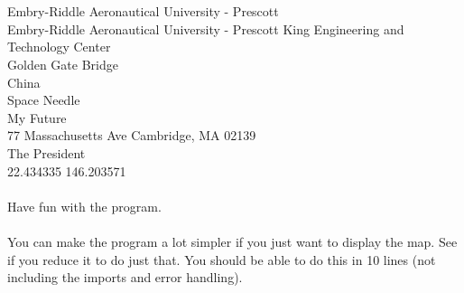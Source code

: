 \documentclass[11pt]{article}   %
\begin{document}
\\\\
Embry-Riddle Aeronautical University - Prescott\\
Embry-Riddle Aeronautical University - Prescott King Engineering and Technology Center\\
Golden Gate Bridge\\
China\\
Space Needle\\
My Future\\
77 Massachusetts Ave Cambridge, MA 02139\\
The President\\
22.434335 146.203571\\\\
Have fun with the program.\\

\\
You can make the program a lot simpler if you just want to display the map.  See if you reduce it to do just that.  You should be able to do this in 10 
lines (not including the imports and error handling).  \\
\end{document}
